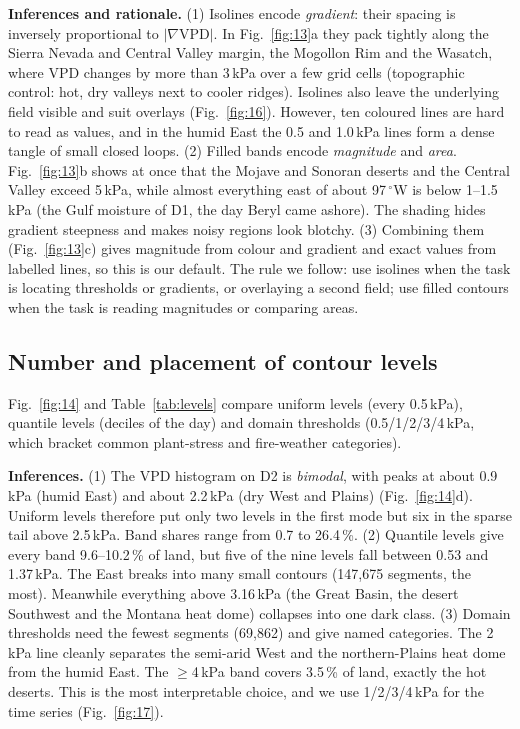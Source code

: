 \textbf{Inferences and rationale.}
(1) Isolines encode \emph{gradient}: their spacing is inversely proportional to $|\nabla\mathrm{VPD}|$. In
Fig.~\ref{fig:13}a they pack tightly along the Sierra Nevada and Central Valley margin, the Mogollon Rim and the Wasatch,
where VPD changes by more than 3\,kPa over a few grid cells (topographic control: hot, dry valleys next to cooler
ridges). Isolines also leave the underlying field visible and suit overlays (Fig.~\ref{fig:16}). However, ten coloured
lines are hard to read as values, and in the humid East the 0.5 and 1.0\,kPa lines form a dense tangle of small closed
loops.
(2) Filled bands encode \emph{magnitude} and \emph{area}. Fig.~\ref{fig:13}b shows at once that the Mojave and Sonoran
deserts and the Central Valley exceed 5\,kPa, while almost everything east of about 97\,$^\circ$W is below 1--1.5\,kPa (the Gulf
moisture of D1, the day Beryl came ashore). The shading hides gradient steepness and makes noisy regions look blotchy.
(3) Combining them (Fig.~\ref{fig:13}c) gives magnitude from colour and gradient and exact values from labelled lines, so
this is our default. The rule we follow: use isolines when the task is locating thresholds or gradients, or overlaying a
second field; use filled contours when the task is reading magnitudes or comparing areas.

\subsection{Number and placement of contour levels}
Fig.~\ref{fig:14} and Table~\ref{tab:levels} compare uniform levels (every 0.5\,kPa), quantile levels (deciles of the day)
and domain thresholds (0.5/1/2/3/4\,kPa, which bracket common plant-stress and fire-weather categories).




\textbf{Inferences.}
(1) The VPD histogram on D2 is \emph{bimodal}, with peaks at about 0.9\,kPa (humid East) and about 2.2\,kPa (dry West and Plains)
(Fig.~\ref{fig:14}d). Uniform levels therefore put only two levels in the first mode but six in the sparse tail
above 2.5\,kPa. Band shares range from 0.7 to 26.4\,\%.
(2) Quantile levels give every band 9.6--10.2\,\% of land, but five of the nine levels fall between 0.53 and 1.37\,kPa. The
East breaks into many small contours (147,675 segments, the most). Meanwhile everything above 3.16\,kPa (the Great
Basin, the desert Southwest and the Montana heat dome) collapses into one dark class.
(3) Domain thresholds need the fewest segments (69,862) and give named categories. The 2\,kPa line cleanly separates the
semi-arid West and the northern-Plains heat dome from the humid East. The $\ge$4\,kPa band covers 3.5\,\% of land, exactly
the hot deserts. This is the most interpretable choice, and we use 1/2/3/4\,kPa for the time series (Fig.~\ref{fig:17}).

